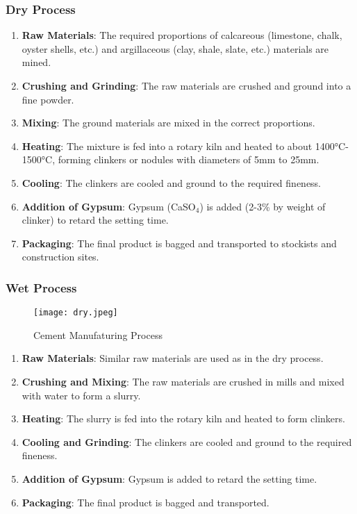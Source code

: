 \documentclass[a4paper,11pt]{book}
\begin{document}
\subsubsection*{Dry Process}
\begin{enumerate}
    \item \textbf{Raw Materials}: The required proportions of calcareous (limestone, chalk, oyster shells, etc.) and argillaceous (clay, shale, slate, etc.) materials are mined.
    \item \textbf{Crushing and Grinding}: The raw materials are crushed and ground into a fine powder.
    \item \textbf{Mixing}: The ground materials are mixed in the correct proportions.
    \item \textbf{Heating}: The mixture is fed into a rotary kiln and heated to about 1400°C-1500°C, forming clinkers or nodules with diameters of 5mm to 25mm.
    \item \textbf{Cooling}: The clinkers are cooled and ground to the required fineness.
    \item \textbf{Addition of Gypsum}: Gypsum (CaSO$_4$) is added (2-3\% by weight of clinker) to retard the setting time.
    \item \textbf{Packaging}: The final product is bagged and transported to stockists and construction sites.
\end{enumerate}

\subsubsection*{Wet Process}
\begin{figure}[h]
    \centering
    \texttt{[image: dry.jpeg]} %
    \caption{Cement Manufaturing Process}
    \label{fig:example}
\end{figure}
\vspace{-1cm} %
\begin{enumerate}[itemsep=0.5em, parsep=0em, partopsep=0em, topsep=0em, left=0em]
    \item \textbf{Raw Materials}: Similar raw materials are used as in the dry process.
    \item \textbf{Crushing and Mixing}: The raw materials are crushed in mills and mixed with water to form a slurry.
    \item \textbf{Heating}: The slurry is fed into the rotary kiln and heated to form clinkers.
    \item \textbf{Cooling and Grinding}: The clinkers are cooled and ground to the required fineness.
    \item \textbf{Addition of Gypsum}: Gypsum is added to retard the setting time.
    \item \textbf{Packaging}: The final product is bagged and transported.
\end{enumerate}
\end{document}
